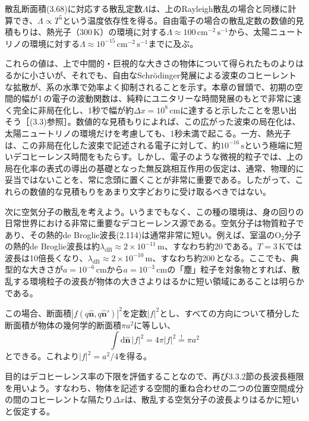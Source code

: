 散乱断面積(3.68)に対応する散乱定数$\Lambda$は、上のRayleigh散乱の場合と同様に計算でき、$\Lambda\propto T^5$という温度依存性を得る。自由電子の場合の散乱定数の数値的見積もりは、熱光子（300\,K）の環境に対する$\Lambda\approx100\,\mathrm{cm}^{-2}\,\mathrm s^{-1}$から、太陽ニュートリノの環境に対する$\Lambda\approx10^{-15}\,\mathrm{cm}^{-2}\,\mathrm s^{-1}$までに及ぶ\cite{ref166}。

\hypertarget{srcpage:136}{}\label{srcpage:136}
これらの値は、上で中間的・巨視的な大きさの物体について得られたものよりはるかに小さいが、それでも、自由なSchrödinger発展による波束のコヒーレントな拡散が、系の水準で効率よく抑制されることを示す。本章の冒頭で、初期の空間的幅が1\,\text{\AA}の電子の波動関数は、純粋にユニタリーな時間発展のもとで非常に速く完全に非局在化し、1秒で幅が約$\Delta x=10^8\,\mathrm{cm}$に達すると示したことを思い出そう［(3.3)参照］。数値的な見積もりによれば、この広がった波束の局在化は、太陽ニュートリノの環境だけを考慮しても、1秒未満で起こる。一方、熱光子は、この非局在化した波束で記述される電子に対して、約$10^{-16}\,\mathrm s$という極端に短いデコヒーレンス時間をもたらす。しかし、電子のような微視的粒子では、上の局在化率の表式の導出の基礎となった無反跳相互作用の仮定は、通常、物理的に妥当ではないことを、常に念頭に置くことが非常に重要である。したがって、これらの数値的な見積もりをあまり文字どおりに受け取るべきではない。

次に空気分子の散乱を考えよう。いうまでもなく、この種の環境は、身の回りの日常世界における非常に重要なデコヒーレンス源である。空気分子は物質粒子であり、その熱的de Broglie波長(2.114)は通常非常に短い。例えば、室温のO$_2$分子の熱的de Broglie波長は約$\lambda_{\mathrm{dB}}\approx2\times10^{-11}\,\mathrm m$、すなわち約20\,\text{\AA}である。$T=3\,\mathrm K$では波長は10倍長くなり、$\lambda_{\mathrm{dB}}\approx2\times10^{-10}\,\mathrm m$、すなわち約200\,\text{\AA}となる。ここでも、典型的な大きさが$a=10^{-6}\,\mathrm{cm}$から$a=10^{-3}\,\mathrm{cm}$の「塵」粒子を対象物とすれば、散乱する環境粒子の波長が物体の大きさよりはるかに短い領域にあることは明らかである。

この場合、断面積$|f(q\hat{\bm n},q\hat{\bm n}')|^2$を定数$|f|^2$とし、すべての方向について積分した断面積が物体の幾何学的断面積$\pi a^2$に等しい、
\begin{equation}
\int\mathrm d\hat{\bm n}\,|f|^2=4\pi|f|^2\overset{!}{=}\pi a^2
\tag{3.69}
\end{equation}
とできる。これより$|f|^2=a^2/4$を得る。

目的はデコヒーレンス率の下限を評価することなので、再び3.3.2節の長波長極限を用いよう。すなわち、物体を記述する空間的重ね合わせの二つの位置空間成分の間のコヒーレントな隔たり$\Delta x$は、散乱する空気分子の波長よりはるかに短いと仮定する。

